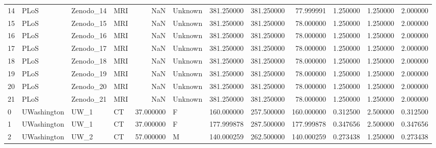 \begin{tabular}{llllrlrrrrrr}
14     &            PLoS &    Zenodo\_14 &                MRI &        NaN &  Unknown &       381.250000 &    381.250000 &   77.999991 &               1.250000 &            1.250000 &          2.000000 \\
15     &            PLoS &    Zenodo\_15 &                MRI &        NaN &  Unknown &       381.250000 &    381.250000 &   78.000000 &               1.250000 &            1.250000 &          2.000000 \\
16     &            PLoS &    Zenodo\_16 &                MRI &        NaN &  Unknown &       381.250000 &    381.250000 &   78.000000 &               1.250000 &            1.250000 &          2.000000 \\
17     &            PLoS &    Zenodo\_17 &                MRI &        NaN &  Unknown &       381.250000 &    381.250000 &   78.000000 &               1.250000 &            1.250000 &          2.000000 \\
18     &            PLoS &    Zenodo\_18 &                MRI &        NaN &  Unknown &       381.250000 &    381.250000 &   78.000000 &               1.250000 &            1.250000 &          2.000000 \\
19     &            PLoS &    Zenodo\_19 &                MRI &        NaN &  Unknown &       381.250000 &    381.250000 &   78.000000 &               1.250000 &            1.250000 &          2.000000 \\
20     &            PLoS &    Zenodo\_20 &                MRI &        NaN &  Unknown &       381.250000 &    381.250000 &   78.000000 &               1.250000 &            1.250000 &          2.000000 \\
21     &            PLoS &    Zenodo\_21 &                MRI &        NaN &  Unknown &       381.250000 &    381.250000 &   78.000000 &               1.250000 &            1.250000 &          2.000000 \\
0      &     UWashington &         UW\_1 &                 CT &  37.000000 &        F &       160.000000 &    257.500000 &  160.000000 &               0.312500 &            2.500000 &          0.312500 \\
1      &     UWashington &         UW\_1 &                 CT &  37.000000 &        F &       177.999878 &    287.500000 &  177.999878 &               0.347656 &            2.500000 &          0.347656 \\
2      &     UWashington &         UW\_2 &                 CT &  57.000000 &        M &       140.000259 &    262.500000 &  140.000259 &               0.273438 &            1.250000 &          0.273438 \\

\end{tabular}
